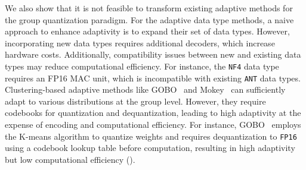 




We also show that it is not feasible to transform existing adaptive methods for the group quantization paradigm.
For the adaptive data type methods, a naive approach to enhance adaptivity is to expand their set of data types. However, incorporating new data types requires additional decoders, which increase hardware costs. 
Additionally, compatibility issues between new and existing data types may reduce computational efficiency. For instance, the \texttt{NF4} data type~\cite{dettmers2023qlora} requires an FP16 MAC unit, which is incompatible with existing \texttt{ANT} data types.
Clustering-based adaptive methods like GOBO~\cite{zadeh2020gobo} and Mokey~\cite{zadeh2022mokey} can sufficiently adapt to various distributions at the group level. However, they require codebooks for quantization and dequantization, leading to high adaptivity at the expense of encoding and computational efficiency. 
For instance, GOBO~\cite{zadeh2020gobo} employs the K-means algorithm to quantize weights and requires dequantization to \texttt{FP16} using a codebook lookup table before computation, resulting in high adaptivity but low computational efficiency (). 

